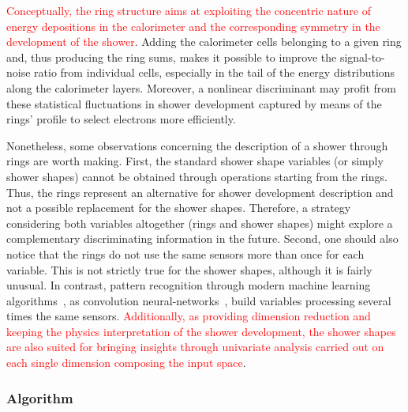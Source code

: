\textcolor{red}{Conceptually, the ring structure aims at exploiting the concentric nature of energy depositions in the calorimeter and the corresponding symmetry in the development of the shower}.  
Adding the calorimeter cells belonging to a given ring and, thus producing the ring sums, makes it possible to improve the signal-to-noise ratio from individual cells, especially in the tail of the energy distributions along the calorimeter layers.  
Moreover, a nonlinear discriminant may profit from these statistical fluctuations in shower development captured by means of the rings' profile to select electrons more efficiently.

Nonetheless, some observations concerning the description of a shower through rings are
worth making. First, the standard shower shape variables (or simply shower shapes) cannot be obtained through operations starting from the rings.  Thus, the rings represent an alternative for shower development description and not a possible replacement for the shower shapes.  Therefore, a strategy considering both variables altogether (rings and shower shapes) might explore a complementary discriminating information in the future.
Second, one should also notice
that the rings do not use the same sensors more than once for each variable.
This is not strictly true for the shower shapes, although it is fairly unusual.
In contrast, pattern recognition through modern machine learning
algorithms~\cite{Engelbrecht2007,Goodfellow2016}, as convolution
neural-networks~\cite{Gu2018}, build variables processing several times
the same sensors. \textcolor{red}{Additionally, as providing dimension reduction and keeping the
physics interpretation of the shower development, the shower shapes are also suited
for bringing insights through univariate analysis carried out on each
single dimension composing the input space}.

\subsubsection{\fastcalo Algorithm}\label{top:algorithm}

